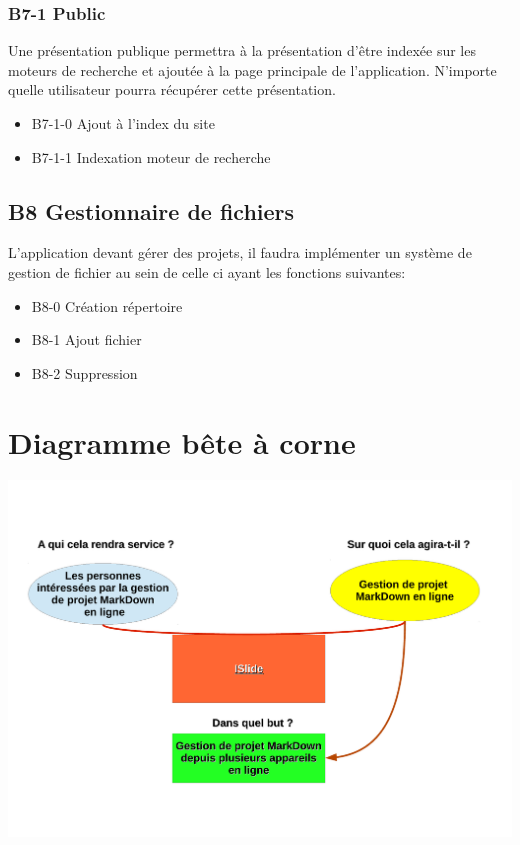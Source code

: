 \documentclass[11pt,a4paper]{article}
\begin{document}
\subsubsection{B7-1 Public}
Une présentation publique permettra à la présentation d'être indexée sur les moteurs de recherche et ajoutée à la page principale de l'application. N'importe quelle utilisateur pourra récupérer cette présentation.

\begin{itemize}
\item B7-1-0 Ajout à l'index du site
\item B7-1-1 Indexation moteur de recherche
\end{itemize}

\subsection{B8 Gestionnaire de fichiers}
L'application devant gérer des projets, il faudra implémenter un système de gestion de fichier au sein de celle ci ayant les fonctions suivantes:
\begin{itemize}
\item B8-0 Création répertoire
\item B8-1 Ajout fichier
\item B8-2 Suppression
\end{itemize}



\section{Diagramme bête à corne}

\includegraphics[scale=0.5]{bete-a-corne.pdf}
\end{document}
